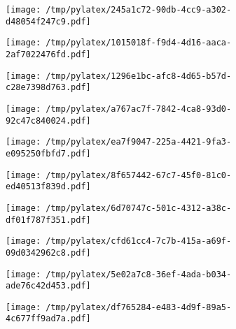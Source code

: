 \documentclass{article}
\begin{document}
\begin{figure}[htbp]
\begin{subfigure}[b]{.3\linewidth}
\texttt{[image: /tmp/pylatex/245a1c72-90db-4cc9-a302-d48054f247c9.pdf]}
\end{subfigure}
\begin{subfigure}[b]{.3\linewidth}
\texttt{[image: /tmp/pylatex/1015018f-f9d4-4d16-aaca-2af7022476fd.pdf]}
\end{subfigure}
\begin{subfigure}[b]{.3\linewidth}
\texttt{[image: /tmp/pylatex/1296e1bc-afc8-4d65-b57d-c28e7398d763.pdf]}
\end{subfigure}
\begin{subfigure}[b]{.3\linewidth}
\texttt{[image: /tmp/pylatex/a767ac7f-7842-4ca8-93d0-92c47c840024.pdf]}
\end{subfigure}
\begin{subfigure}[b]{.3\linewidth}
\texttt{[image: /tmp/pylatex/ea7f9047-225a-4421-9fa3-e095250fbfd7.pdf]}
\end{subfigure}
\begin{subfigure}[b]{.3\linewidth}
\texttt{[image: /tmp/pylatex/8f657442-67c7-45f0-81c0-ed40513f839d.pdf]}
\end{subfigure}
\begin{subfigure}[b]{.3\linewidth}
\texttt{[image: /tmp/pylatex/6d70747c-501c-4312-a38c-df01f787f351.pdf]}
\end{subfigure}
\begin{subfigure}[b]{.3\linewidth}
\texttt{[image: /tmp/pylatex/cfd61cc4-7c7b-415a-a69f-09d0342962c8.pdf]}
\end{subfigure}
\begin{subfigure}[b]{.3\linewidth}
\texttt{[image: /tmp/pylatex/5e02a7c8-36ef-4ada-b034-ade76c42d453.pdf]}
\end{subfigure}
\begin{subfigure}[b]{.3\linewidth}
\texttt{[image: /tmp/pylatex/df765284-e483-4d9f-89a5-4c677ff9ad7a.pdf]}
\end{subfigure}
\end{figure}
\end{document}
